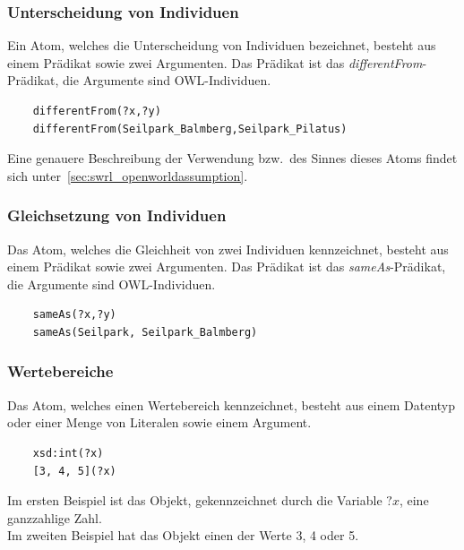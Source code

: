 \subsubsection{Unterscheidung von Individuen}
\label{ssubsec:swrl_aufbau_atomaretypen_unterscheidungvonindividuen}
Ein Atom, welches die Unterscheidung von Individuen bezeichnet, besteht aus einem Prädikat sowie zwei Argumenten. Das Prädikat ist das \textit{differentFrom}-Prädikat, die Argumente sind OWL-Individuen.
\lstset{language=XML}
\begin{lstlisting}
    differentFrom(?x,?y)
    differentFrom(Seilpark_Balmberg,Seilpark_Pilatus)
\end{lstlisting}
Eine genauere Beschreibung der Verwendung bzw.\ des Sinnes dieses Atoms findet sich unter~\ref{sec:swrl_openworldassumption}.

\subsubsection{Gleichsetzung von Individuen}
\label{ssubsec:swrl_aufbau_atomaretypen_gleichsetzungvonindividuen}
Das Atom, welches die Gleichheit von zwei Individuen kennzeichnet, besteht aus einem Prädikat sowie zwei Argumenten. Das Prädikat ist das \textit{sameAs}-Prädikat, die Argumente sind OWL-Individuen.
\lstset{language=XML}
\begin{lstlisting}
    sameAs(?x,?y)
    sameAs(Seilpark, Seilpark_Balmberg)
\end{lstlisting}

\subsubsection{Wertebereiche}
\label{ssubsec:swrl_aufbau_atomaretypen_wertebereiche}
Das Atom, welches einen Wertebereich kennzeichnet, besteht aus einem Datentyp oder einer Menge von Literalen sowie einem Argument.
\lstset{language=XML}
\begin{lstlisting}
    xsd:int(?x)
    [3, 4, 5](?x)
\end{lstlisting}
Im ersten Beispiel ist das Objekt, gekennzeichnet durch die Variable $?x$, eine ganzzahlige Zahl.\\
Im zweiten Beispiel hat das Objekt einen der Werte 3, 4 oder 5.

